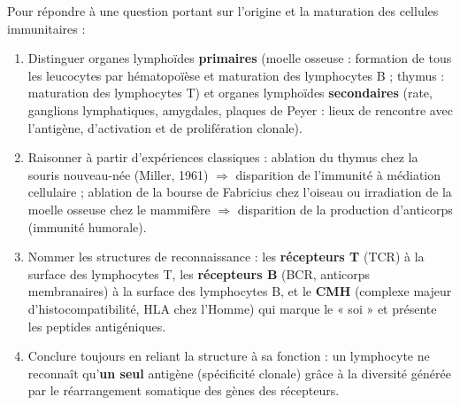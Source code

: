 \documentclass[11pt]{article}
\newcommand{\cle}[1]{{\popxbold\color{popdark}#1}}
\begin{document}
\begin{methode}
Pour répondre à une question portant sur l'origine et la maturation des cellules immunitaires :
\begin{enumerate}
\item \cle{Distinguer} organes lymphoïdes \textbf{primaires} (moelle osseuse : formation de tous les leucocytes par hématopoïèse et maturation des lymphocytes B ; thymus : maturation des lymphocytes T) et organes lymphoïdes \textbf{secondaires} (rate, ganglions lymphatiques, amygdales, plaques de Peyer : lieux de rencontre avec l'antigène, d'activation et de prolifération clonale).
\item \cle{Raisonner} à partir d'expériences classiques : ablation du thymus chez la souris nouveau-née (Miller, 1961) $\Rightarrow$ disparition de l'immunité à médiation cellulaire ; ablation de la bourse de Fabricius chez l'oiseau ou irradiation de la moelle osseuse chez le mammifère $\Rightarrow$ disparition de la production d'anticorps (immunité humorale).
\item \cle{Nommer} les structures de reconnaissance : les \textbf{récepteurs T} (TCR) à la surface des lymphocytes T, les \textbf{récepteurs B} (BCR, anticorps membranaires) à la surface des lymphocytes B, et le \textbf{CMH} (complexe majeur d'histocompatibilité, HLA chez l'Homme) qui marque le « soi » et présente les peptides antigéniques.
\item \cle{Conclure} toujours en reliant la structure à sa fonction : un lymphocyte ne reconnaît qu'\textbf{un seul} antigène (spécificité clonale) grâce à la diversité générée par le réarrangement somatique des gènes des récepteurs.
\end{enumerate}
\end{methode}
\end{document}
